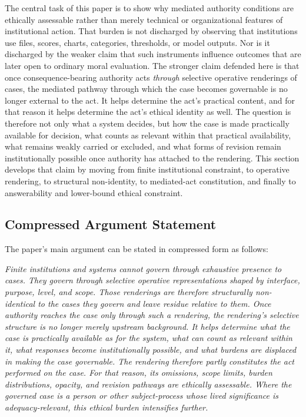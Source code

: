 \documentclass[11pt]{article}
\renewenvironment{quote}
  {\list{}{\leftmargin=1.4em \rightmargin=1.0em}%
   \item\relax\color{softink}\itshape}
  {\endlist}
\renewcommand{\emph}[1]{\textit{#1}}
\begin{document}
The central task of this paper is to show why mediated authority conditions are ethically assessable rather than merely technical or organizational features of institutional action. That burden is not discharged by observing that institutions use files, scores, charts, categories, thresholds, or model outputs. Nor is it discharged by the weaker claim that such instruments influence outcomes that are later open to ordinary moral evaluation. The stronger claim defended here is that once consequence-bearing authority acts \emph{through} selective operative renderings of cases, the mediated pathway through which the case becomes governable is no longer external to the act. It helps determine the act's practical content, and for that reason it helps determine the act's ethical identity as well. The question is therefore not only what a system decides, but how the case is made practically available for decision, what counts as relevant within that practical availability, what remains weakly carried or excluded, and what forms of revision remain institutionally possible once authority has attached to the rendering. This section develops that claim by moving from finite institutional constraint, to operative rendering, to structural non-identity, to mediated-act constitution, and finally to answerability and lower-bound ethical constraint. \cite{Swanson2026MediatedJudgmentConstraint,Swanson2026ConstraintConditionDisclosure,Swanson2026EmbeddedProcess,Swanson2026ConstrainedDescribability}

\subsection{Compressed Argument Statement}

The paper's main argument can be stated in compressed form as follows:

\begin{quote}
Finite institutions and systems cannot govern through exhaustive presence to cases. They govern through selective operative representations shaped by interface, purpose, level, and scope. Those renderings are therefore structurally non-identical to the cases they govern and leave residue relative to them. Once authority reaches the case only through such a rendering, the rendering's selective structure is no longer merely upstream background. It helps determine what the case is practically available as for the system, what can count as relevant within it, what responses become institutionally possible, and what burdens are displaced in making the case governable. The rendering therefore partly constitutes the act performed on the case. For that reason, its omissions, scope limits, burden distributions, opacity, and revision pathways are ethically assessable. Where the governed case is a person or other subject-process whose lived significance is adequacy-relevant, this ethical burden intensifies further.
\end{quote}
\end{document}
